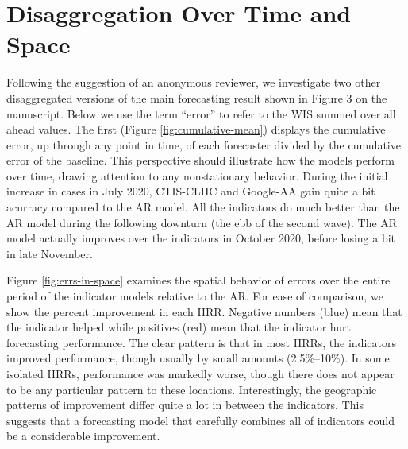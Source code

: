 \section{Disaggregation Over Time and Space}

Following the suggestion of an anonymous reviewer, we investigate two
other disaggregated versions of the main forecasting result shown in Figure 3 on the
manuscript. Below we use the term ``error'' to refer to the WIS summed over all
ahead values.  The first (Figure \ref{fig:cumulative-mean}) displays the
cumulative error, up through any point in time, of each forecaster divided by
the cumulative error of the baseline.  This perspective should illustrate how
the models perform over time, drawing attention to any nonstationary behavior.
During the initial increase in cases in July 2020, CTIS-CLIIC and Google-AA gain
quite a bit acurracy compared to the AR model.  All the indicators do much
better than the AR model during the following downturn (the ebb of the second 
wave). The AR model actually improves over the indicators in October 2020,
before losing a bit in late November. %

Figure \ref{fig:errs-in-space} examines the spatial behavior of errors over the
entire period of the indicator models relative to the AR.  For ease of
comparison, we show the percent improvement in each HRR.  Negative numbers
(blue) mean that the indicator helped while positives (red) mean that the
indicator hurt forecasting performance.  The clear pattern is that in most HRRs,
the indicators improved performance, though usually by small amounts
(2.5\%--10\%).  In some isolated HRRs, performance was markedly worse, though
there does not appear to be any particular pattern to these locations.
Interestingly, the geographic patterns of improvement differ quite a lot in
between the indicators.  This suggests that a forecasting model that carefully
combines all of indicators could be a considerable improvement. 
